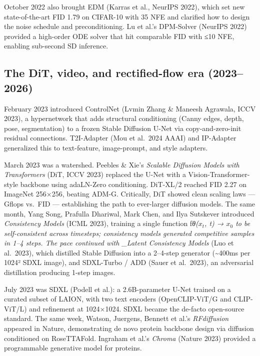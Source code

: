 October 2022 also brought EDM (Karras et al., NeurIPS 2022), which set new state-of-the-art FID 1.79 on CIFAR-10 with 35 NFE and clarified how to design the noise schedule and preconditioning. Lu et al.'s DPM-Solver (NeurIPS 2022) provided a high-order ODE solver that hit comparable FID with ≤10 NFE, enabling sub-second SD inference.

\subsection{The DiT, video, and rectified-flow era (2023--2026)}\label{the-dit-video-and-rectified-flow-era-20232026}

February 2023 introduced ControlNet (Lvmin Zhang \& Maneesh Agrawala, ICCV 2023), a hypernetwork that adds structural conditioning (Canny edges, depth, pose, segmentation) to a frozen Stable Diffusion U-Net via copy-and-zero-init residual connections. T2I-Adapter (Mou et al.~2024 AAAI) and IP-Adapter generalized this to text-feature, image-prompt, and style adapters.

March 2023 was a watershed. Peebles \& Xie's \emph{Scalable Diffusion Models with Transformers} (DiT, ICCV 2023) replaced the U-Net with a Vision-Transformer-style backbone using adaLN-Zero conditioning. DiT-XL/2 reached FID 2.27 on ImageNet 256×256, beating ADM-G. Critically, DiT showed clean scaling laws --- Gflops vs.~FID --- establishing the path to ever-larger diffusion models. The same month, Yang Song, Prafulla Dhariwal, Mark Chen, and Ilya Sutskever introduced \emph{Consistency Models} (ICML 2023), training a single function f\emph{θ(\(x_t\), t) → \(x_0\) to be self-consistent across timesteps; consistency models generated competitive samples in 1--4 steps. The pace continued with \_Latent Consistency Models} (Luo et al.~2023), which distilled Stable Diffusion into a 2--4-step generator (\textasciitilde400ms per 1024² SDXL image), and SDXL-Turbo / ADD (Sauer et al.~2023), an adversarial distillation producing 1-step images.

July 2023 was SDXL (Podell et al.): a 2.6B-parameter U-Net trained on a curated subset of LAION, with two text encoders (OpenCLIP-ViT/G and CLIP-ViT/L) and refinement at 1024×1024. SDXL became the de-facto open-source standard. The same week, Watson, Juergens, Bennett et al.'s \emph{RFdiffusion} appeared in Nature, demonstrating de novo protein backbone design via diffusion conditioned on RoseTTAFold. Ingraham et al.'s \emph{Chroma} (Nature 2023) provided a programmable generative model for proteins.


